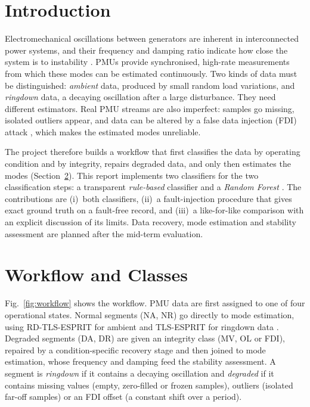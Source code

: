 \documentclass[12pt,letterpaper]{article}
\begin{document}
\section{Introduction}
Electromechanical oscillations between generators are inherent in interconnected power systems, and their frequency and damping ratio indicate how close the system is to instability \cite{kundur2004}. PMUs provide synchronised, high-rate measurements from which these modes can be estimated continuously. Two kinds of data must be distinguished: \emph{ambient} data, produced by small random load variations, and \emph{ringdown} data, a decaying oscillation after a large disturbance. They need different estimators. Real PMU streams are also imperfect: samples go missing, isolated outliers appear, and data can be altered by a false data injection (FDI) attack \cite{liu2009}, which makes the estimated modes unreliable.

The project therefore builds a workflow that first classifies the data by operating condition and by integrity, repairs degraded data, and only then estimates the modes (Section~\ref{sec:workflow}). This report implements two classifiers for the two classification steps: a transparent \emph{rule-based} classifier and a \emph{Random Forest} \cite{breiman2001}. The contributions are (i)~both classifiers, (ii)~a fault-injection procedure that gives exact ground truth on a fault-free record, and (iii)~a like-for-like comparison with an explicit discussion of its limits. Data recovery, mode estimation and stability assessment are planned after the mid-term evaluation.

\section{Workflow and Classes}\label{sec:workflow}
Fig.~\ref{fig:workflow} shows the workflow. PMU data are first assigned to one of four operational states. Normal segments (NA, NR) go directly to mode estimation, using RD-TLS-ESPRIT for ambient and TLS-ESPRIT for ringdown data \cite{roy1989}. Degraded segments (DA, DR) are given an integrity class (MV, OL or FDI), repaired by a condition-specific recovery stage and then joined to mode estimation, whose frequency and damping feed the stability assessment. A segment is \emph{ringdown} if it contains a decaying oscillation and \emph{degraded} if it contains missing values (empty, zero-filled or frozen samples), outliers (isolated far-off samples) or an FDI offset (a constant shift over a period).
\end{document}
